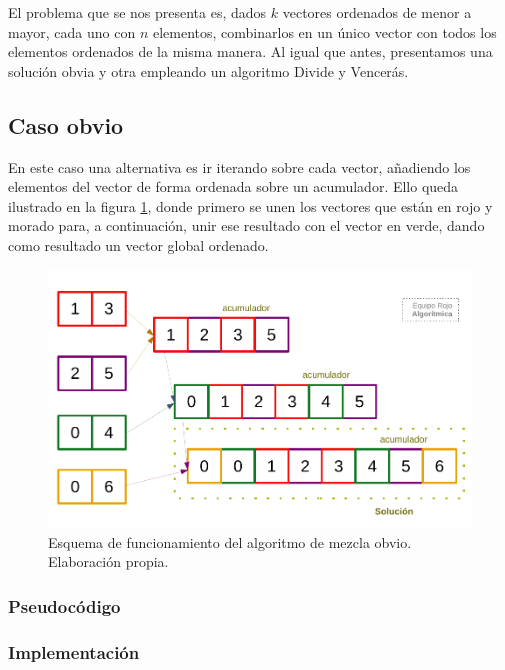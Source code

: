 El problema que se nos presenta es, dados $k$ vectores ordenados de menor a mayor,
cada uno con $n$ elementos, combinarlos en un único vector con todos los elementos
ordenados de la misma manera. Al igual que antes, presentamos una solución obvia y
otra empleando un algoritmo Divide y Vencerás. 

\subsection{Caso obvio}

En este caso una alternativa es ir iterando sobre cada vector, añadiendo los elementos
del vector de forma ordenada sobre un acumulador. Ello queda ilustrado en la figura
\ref{fig:2a-obvio}, donde primero se unen los vectores que están en rojo y morado para,
a continuación, unir ese resultado con el vector en verde, dando como resultado
un vector global ordenado. 

\begin{figure}
    \centering
    \includegraphics[scale=0.87]{img/orden_2a.pdf}
    \caption{Esquema de funcionamiento del algoritmo de 
    mezcla obvio. Elaboración propia.}
    \label{fig:2a-obvio}
\end{figure}

\subsubsection{Pseudocódigo}



\subsubsection{Implementación}

